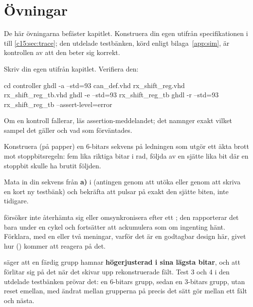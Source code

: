 
\section{Övningar}
\label{c15:sec:exercises}

\begin{aside}
De här övningarna befäster kapitlet. Konstruera din egen  utifrån
specifikationen i  till \ref{c15:sec:trace}; den utdelade testbänken, körd
enligt bilaga~\ref{app:sim}, är kontrollen av att den beter sig korrekt.
\end{aside}

\label{c15:ex:rxsr}
Skriv din egen  utifrån kapitlet. Verifiera den:

\begin{shell}
cd controller
ghdl -a --std=93 can_def.vhd rx_shift_reg.vhd rx_shift_reg_tb.vhd
ghdl -e --std=93 rx_shift_reg_tb
ghdl -r --std=93 rx_shift_reg_tb --assert-level=error
\end{shell}

Om en kontroll fallerar, läs assertion-meddelandet; det namnger exakt vilket sampel det gäller och
vad som förväntades.

\label{c15:ex:violation}
 Konstruera (på papper) en 6-bitars sekvens på ledningen som utgör ett äkta brott mot
stoppbitsregeln: fem lika riktiga bitar i rad, följda av en sjätte lika bit där en stoppbit skulle ha
brutit följden.

 Mata in din sekvens från \textbf{a)} i  (antingen genom att utöka
 eller genom att skriva en kort ny testbänk) och bekräfta att
 pulsar på exakt den sjätte biten, inte tidigare.

  försöker inte återhämta sig eller omsynkronisera efter ett
; den rapporterar det bara under en cykel och fortsätter att ackumulera som om
ingenting hänt. Förklara, med en eller två meningar, varför det är en godtagbar design här, givet hur
 () kommer att reagera på det.

\label{c15:ex:justify}
 säger att en färdig grupp hamnar \textbf{högerjusterad i sina lägsta
 bitar}, och att  förlitar sig på det när det skivar upp
rekonstruerade fält. Test 3 och 4 i den utdelade testbänken prövar det: en 6-bitars grupp, sedan en
3-bitars grupp, utan reset emellan, med  ändrat mellan grupperna på precis det sätt
 gör mellan ett fält och nästa.

